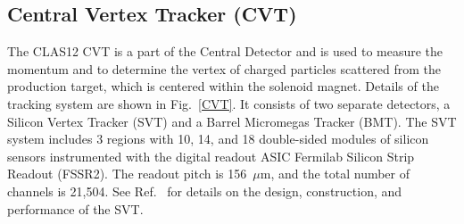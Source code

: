 \documentclass[final,3p]{elsarticle}
\begin{document}
\begin{twocolumn}
\subsection{Central Vertex Tracker (CVT)}

The CLAS12 CVT is a part of the Central Detector and is used to measure the momentum and to determine the vertex
of charged particles scattered from the production target, which is centered within the solenoid magnet. Details of
the tracking system are shown in Fig.~\ref{CVT}. It consists of two separate detectors, a Silicon Vertex Tracker
(SVT) and a Barrel Micromegas Tracker  (BMT). The SVT system includes 3 regions with 10, 14, and 18 double-sided
modules of silicon sensors instrumented with the digital readout ASIC Fermilab Silicon Strip Readout (FSSR2). The
readout pitch is 156~$\mu$m, and the total number of channels is 21,504. See Ref.~\cite{SVT} for details on the
design, construction, and performance of the SVT.


\end{twocolumn}
\end{document}
